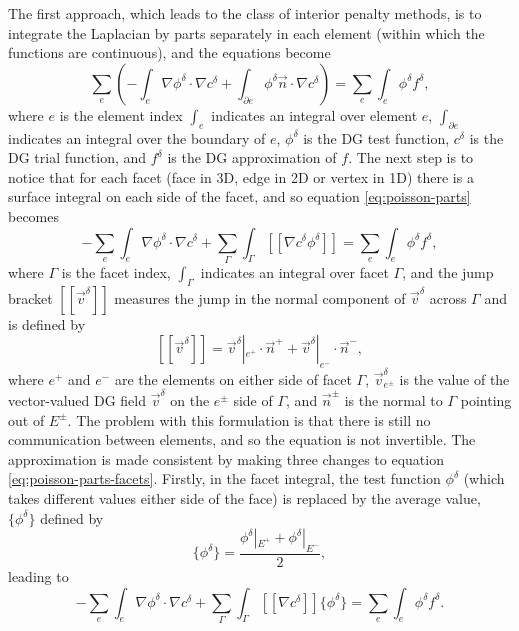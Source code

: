 The first approach, which leads to the class of interior penalty
methods, is to integrate the Laplacian by parts separately in each
element (within which the functions are continuous), and the equations
become
\begin{equation}
\label{eq:poisson-parts}
\sum_e\left(-\int_e\nabla \phi^\delta\cdot\nabla c^\delta +
 \int_{\partial e} \phi^\delta \vec{n}\cdot\nabla c^\delta\right) =
\sum_e\int_e \phi^\delta f^{\delta},
\end{equation}
where $e$ is the element index $\int_e$ indicates an integral over
element $e$, $\int_{\partial e}$ indicates an integral over the
boundary of $e$, $\phi^\delta$ is the DG test function, $c^\delta$ is
the DG trial function, and $f^\delta$ is the DG approximation of $f$.
The next step is to notice that for each facet (face in 3D, edge in 2D
or vertex in 1D) there is a surface integral on each side of the
facet, and so equation \eqref{eq:poisson-parts} becomes
\begin{equation}
\label{eq:poisson-parts-facets}
-\sum_e\int_e\nabla \phi^\delta\cdot\nabla c^\delta +
\sum_\Gamma\int_{\Gamma} [[\nabla c^\delta{\phi}^\delta]] =
\sum_e\int_e \phi^\delta f^{\delta},
\end{equation}
where $\Gamma$ is the facet index, $\int_{\Gamma}$ indicates an
integral over facet $\Gamma$, and the jump bracket
$[[\vec{v}^\delta]]$ measures the jump in the normal component of
$\vec{v}^\delta$ across $\Gamma$ and is defined by
\[
[[\vec{v}^\delta]] = \vec{v}^\delta|_{e^+}\cdot\vec{n}^+ +
\vec{v}^\delta|_{e^-}\cdot\vec{n}^-,
\]
where $e^+$ and $e^-$ are the elements on either side of facet
$\Gamma$, $\vec{v}^\delta_{e^{\pm}}$ is the value of the vector-valued
DG field $\vec{v}^\delta$ on the $e^{\pm}$ side of $\Gamma$, and
$\vec{n}^{\pm}$ is the normal to $\Gamma$ pointing out of
$E^{\pm}$. The problem with this formulation is that there is still no
communication between elements, and so the equation is not
invertible. The approximation is made consistent by making three
changes to equation \eqref{eq:poisson-parts-facets}. Firstly, in the
facet integral, the test function $\phi^\delta$ (which takes different
values either side of the face) is replaced by the average value,
$\{\phi^\delta\}$ defined by
\[
\{\phi^\delta\} = \frac{\phi^\delta|_{E^+} + \phi^\delta|_{E^-}}{2},
\]
leading to
\begin{equation}
\label{eq:poisson-parts-facets-average}
-\sum_e\int_e\nabla \phi^\delta\cdot\nabla c^\delta +
\sum_\Gamma\int_{\Gamma} [[\nabla c^\delta]]\{\phi^\delta\} =
\sum_e\int_e \phi^\delta f^{\delta}.
\end{equation}
